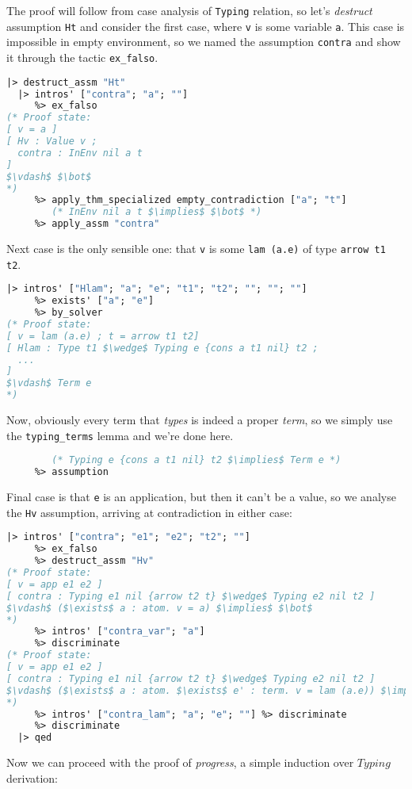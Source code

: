 \documentclass[english, mgr]{iithesis}
\renewcommand{\tt}[1]{\texttt{\small{#1}}}
\renewcommand{\it}[1]{\textit{#1}}
\begin{document}
The proof will follow from case analysis of \tt{Typing} relation, so let's \it{destruct} assumption \tt{Ht}
and consider the first case, where \tt{v} is some variable \tt{a}.
This case is impossible in empty environment, so we named the assumption \tt{contra}
and show it through the tactic \tt{ex\_falso}.
\begin{lstlisting}[mathescape,language=OCaml]
  |> destruct_assm "Ht"
  |> intros' ["contra"; "a"; ""]
     %> ex_falso
(* Proof state:
[ v = a ]
[ Hv : Value v ;
  contra : InEnv nil a t
]
$\vdash$ $\bot$
*)
     %> apply_thm_specialized empty_contradiction ["a"; "t"]
        (* InEnv nil a t $\implies$ $\bot$ *)
     %> apply_assm "contra"
\end{lstlisting}
Next case is the only sensible one: that \tt{v} is some \tt{lam (a.e)} of type \tt{arrow t1 t2}.
\begin{lstlisting}[mathescape,language=OCaml]
  |> intros' ["Hlam"; "a"; "e"; "t1"; "t2"; ""; ""; ""]
     %> exists' ["a"; "e"]
     %> by_solver
(* Proof state:
[ v = lam (a.e) ; t = arrow t1 t2]
[ Hlam : Type t1 $\wedge$ Typing e {cons a t1 nil} t2 ;
  ...
]
$\vdash$ Term e
*)
\end{lstlisting}
Now, obviously every term that \it{types} is indeed a proper \it{term},
so we simply use the \tt{typing\_terms} lemma and we're done here.
\begin{lstlisting}[mathescape,language=OCaml]
     %> apply_thm_specialized typing_terms ["e"; "cons a t1 nil"; "t2"]
        (* Typing e {cons a t1 nil} t2 $\implies$ Term e *)
     %> assumption
\end{lstlisting}
Final case is that \tt{e} is an application, but then it can't be a value,
so we analyse the \tt{Hv} assumption, arriving at contradiction in either case:
\begin{lstlisting}[mathescape, language=OCaml]
  |> intros' ["contra"; "e1"; "e2"; "t2"; ""]
     %> ex_falso
     %> destruct_assm "Hv"
(* Proof state:
[ v = app e1 e2 ]
[ contra : Typing e1 nil {arrow t2 t} $\wedge$ Typing e2 nil t2 ]
$\vdash$ ($\exists$ a : atom. v = a) $\implies$ $\bot$
*)
     %> intros' ["contra_var"; "a"]
     %> discriminate
(* Proof state:
[ v = app e1 e2 ]
[ contra : Typing e1 nil {arrow t2 t} $\wedge$ Typing e2 nil t2 ]
$\vdash$ ($\exists$ a : atom. $\exists$ e' : term. v = lam (a.e)) $\implies$ $\bot$
*)
     %> intros' ["contra_lam"; "a"; "e"; ""] %> discriminate
     %> discriminate
  |> qed
\end{lstlisting}
Now we can proceed with the proof of \it{progress}, a simple induction over $Typing$ derivation:
\end{document}
